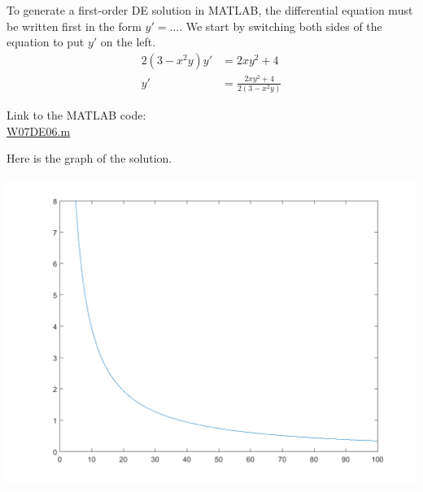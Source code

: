 \begin{enumerate}
\begin{Solution}
  To generate a first-order DE solution in MATLAB, the differential
  equation must be written first in the form $y' = \ldots$.  We start
  by switching both sides of the equation to put $y'$ on the left.
  \begin{align*}
    2(3 - x^2y)y' & = 2xy^2 + 4   \\
    y' & = \frac{ 2xy^2 + 4}{2 (3-x^2 y)} 
  \end{align*}
    
Link to the MATLAB code: \\
\href{http://www.mast.queensu.ca/~apsc171/MNTCP01/PracticeProblems/MATLAB/W07DE06.m}{W07DE06.m}

Here is the graph of the solution.

\includegraphics[width = 0.5\linewidth]{graphics/Week07_DESolutions/W07DE06}
    
    
\end{Solution}


\end{enumerate}







